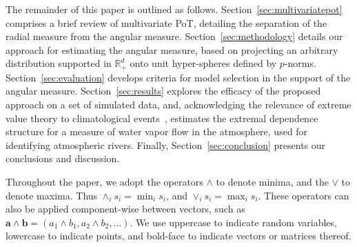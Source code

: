 The remainder of this paper is outlined as follows. 
    Section~\ref{sec:multivariatepot} comprises a brief review of multivariate PoT, 
      detailing the separation of the radial measure from the angular measure.
    Section~\ref{sec:methodology} details our approach for estimating the angular 
      measure, based on projecting an arbitrary distribution supported in ${\mathbb R}_+^d$ 
      onto unit hyper-spheres defined by $p$-norms. 
    Section~\ref{sec:evaluation} develops criteria for model selection in the support 
      of the angular measure.  
    Section~\ref{sec:results} explores the efficacy of the proposed approach on a set 
      of simulated data, and, acknowledging the relevance of extreme value theory to 
      climatological events~\citep{jentsch2007,vousdoukas2018,li2019}, estimates the 
      extremal dependence structure for a measure of water vapor flow in the atmosphere, 
      used for identifying atmospheric rivers.  
    Finally, Section~\ref{sec:conclusion} presents our conclusions and discussion.

Throughout the paper, we adopt the operators $\wedge$ to denote minima, and 
    the $\vee$ to denote maxima.  Thus $\wedge_i s_i = \min_i s_i$, and 
    $\vee_i s_i = \max_i s_i$.  These operators can also be applied component-wise 
    between vectors, such as $\bm{a}\wedge\bm{b} = (a_1\wedge b_1, a_2\wedge b_2,\ldots)$.  
    We use uppercase to indicate random variables, lowercase to indicate points, and
    bold-face to indicate vectors or matrices thereof.
  
